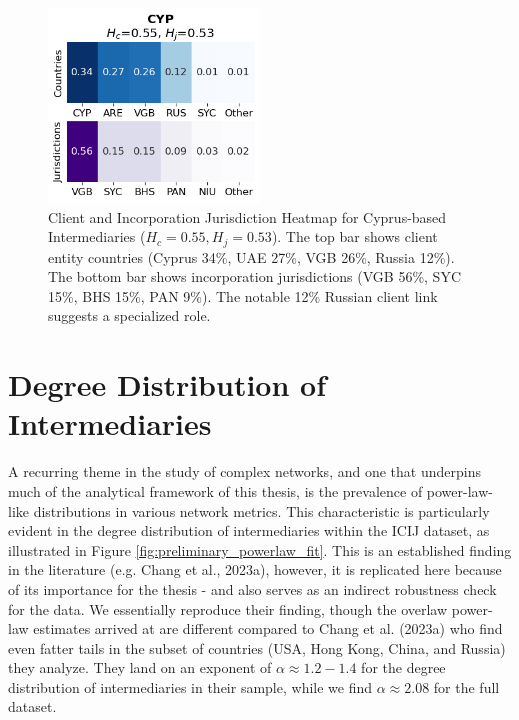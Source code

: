 \begin{figure}[htbp]
    \centering
    \includegraphics[width=0.5\textwidth]{images/Geography_Country_Heatmaps_Cyprus.png} %
    \caption{Client and Incorporation Jurisdiction Heatmap for Cyprus-based Intermediaries ($H_c=0.55, H_j=0.53$). The top bar shows client entity countries (Cyprus 34\%, UAE 27\%, VGB 26\%, Russia 12\%). The bottom bar shows incorporation jurisdictions (VGB 56\%, SYC 15\%, BHS 15\%, PAN 9\%). The notable 12\% Russian client link suggests a specialized role.}
    \label{fig:geography_country_heatmaps_cyprus}
\end{figure}


\section{Degree Distribution of Intermediaries}

\label{subsubsec:degree_dist_intermediaries}
A recurring theme in the study of complex networks, and one that underpins much of the analytical framework of this thesis, is the prevalence of power-law-like distributions in various network metrics. This characteristic is particularly evident in the degree distribution of intermediaries within the ICIJ dataset, as illustrated in Figure \ref{fig:preliminary_powerlaw_fit}. This is an established finding in the literature (e.g. Chang et al., 2023a), however, it is replicated here because of its importance for the thesis - and also serves as an indirect robustness check for the data. We essentially reproduce their finding, though the overlaw power-law estimates arrived at are different compared to Chang et al. (2023a) who find even fatter tails in the subset of countries (USA, Hong Kong, China, and Russia) they analyze. They land on an exponent of $\alpha \approx 1.2-1.4$ for the degree distribution of intermediaries in their sample, while we find $\alpha \approx 2.08$ for the full dataset. 

